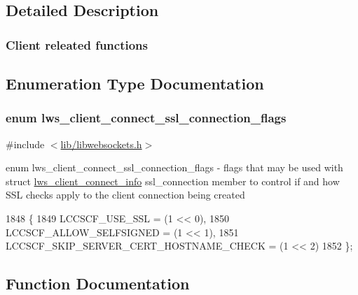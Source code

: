 \subsection{Detailed Description}
\subsubsection*{Client releated functions}

\subsection{Enumeration Type Documentation}
\subsubsection[{\texorpdfstring{lws\+\_\+client\+\_\+connect\+\_\+ssl\+\_\+connection\+\_\+flags}{lws\_client\_connect\_ssl\_connection\_flags}}]{\setlength{\rightskip}{0pt plus 5cm}enum {\bf lws\+\_\+client\+\_\+connect\+\_\+ssl\+\_\+connection\+\_\+flags}}\hypertarget{group__client_ga96f3dbad54b2853969cfa933d66871ce}{}\label{group__client_ga96f3dbad54b2853969cfa933d66871ce}


{\ttfamily \#include $<$\hyperlink{libwebsockets_8h}{lib/libwebsockets.\+h}$>$}

enum lws\+\_\+client\+\_\+connect\+\_\+ssl\+\_\+connection\+\_\+flags -\/ flags that may be used with struct \hyperlink{structlws__client__connect__info}{lws\+\_\+client\+\_\+connect\+\_\+info} ssl\+\_\+connection member to control if and how S\+SL checks apply to the client connection being created 
\begin{DoxyCode}
1848                                              \{
1849         LCCSCF\_USE\_SSL                          = (1 << 0),
1850         LCCSCF\_ALLOW\_SELFSIGNED                 = (1 << 1),
1851         LCCSCF\_SKIP\_SERVER\_CERT\_HOSTNAME\_CHECK  = (1 << 2)
1852 \};
\end{DoxyCode}


\subsection{Function Documentation}
